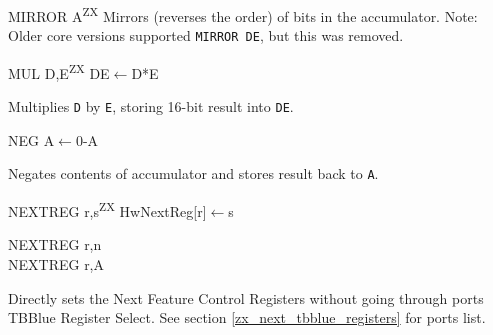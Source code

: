 \documentclass[12pt,twoside,openright,a4paper]{book}
\newcommand{\ZXN}{\textnormal{\textsuperscript{ZX}}}
\begin{document}
\begin{basedescript}{
	\desclabelstyle{\multilinelabel}
	\desclabelwidth{3cm}}
\begin{detailitem}{MIRROR A\ZXN}
		\vspace{7ex}
		Mirrors (reverses the order) of bits in the accumulator. Note: Older core versions supported {\tt MIRROR DE}, but this was removed.

		\DetailNoEffect
				
		\begin{DetailTiming}
		\end{DetailTiming}

	\end{detailitem}

	\begin{detailitem}{MUL D,E\ZXN}
		{DE$\leftarrow$D*E}

		Multiplies {\tt D} by {\tt E}, storing 16-bit result into {\tt DE}.

		\DetailNoEffect
				
		\begin{DetailTiming}
			\DetailTime{}{2}{8}
		\end{DetailTiming}

	\end{detailitem}

	\pagebreak
	\begin{detailitem}{NEG}
		{A$\leftarrow$0-A}

		Negates contents of accumulator and stores result back to {\tt A}.

		\begin{DetailEffects}[p]
			\DetailFlags{\FS}{\FS}{\FS}{\FS}{1}{\FS}
		\end{DetailEffects}
				
		\begin{DetailTiming}
			\DetailTime{}{2}{8}
		\end{DetailTiming}

	\end{detailitem}

	\begin{detailitem}{NEXTREG r,s\ZXN}
		{HwNextReg[r]$\leftarrow$s}

		\begin{DetailVariants}
			NEXTREG r,n\\
			NEXTREG r,A
		\end{DetailVariants}

		Directly sets the Next Feature Control Registers without going through ports TBBlue Register Select. See section \ref{zx_next_tbblue_registers} for ports list.

		\DetailNoEffect
				
		\begin{DetailTiming}
			\DetailTime{r,A}{4}{17}
			\DetailTime{r,n}{5}{20}
		\end{DetailTiming}


\end{detailitem}
\end{basedescript}
\end{document}
